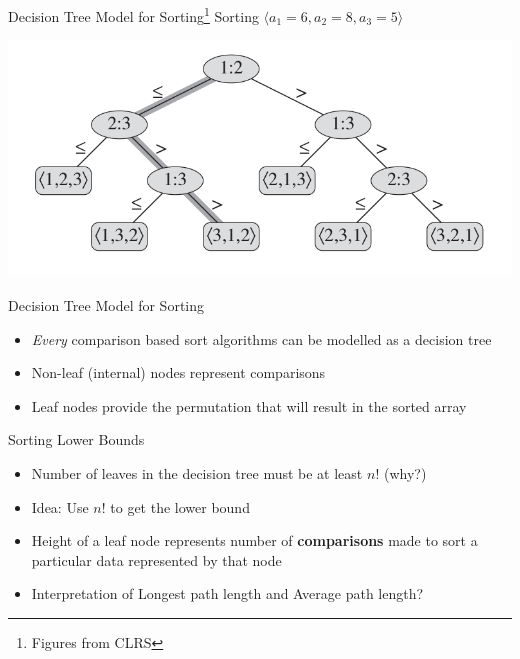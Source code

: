 \documentclass{beamer}
\begin{document}
\begin{frame}{Decision Tree Model for Sorting\footnote{Figures from CLRS}}
Sorting $\langle a_1 = 6, a_2 = 8, a_3 = 5 \rangle$ 
\begin{center}
    \includegraphics[scale=0.36]{sortingDTree3ElemsCLRS.png}
\end{center}
\end{frame}



\begin{frame}{Decision Tree Model for Sorting}
\begin{itemize}
\item {\em Every} comparison based sort algorithms can be modelled as a decision tree
\item Non-leaf (internal) nodes represent comparisons
\item Leaf nodes provide the permutation that will result in the sorted array
\end{itemize}
\end{frame}

\begin{frame}{Sorting Lower Bounds}
\begin{itemize}
\item Number of leaves in the decision tree must be at least $n!$ (why?)
\item Idea: Use $n!$ to get the lower bound
\item Height of a leaf node represents number of {\bf comparisons} made to sort a particular data represented by that node
\item Interpretation of Longest path length and Average path length?
\end{itemize}
\end{frame}
\end{document}
